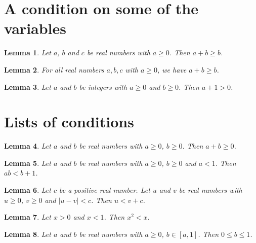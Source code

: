 \documentclass{article}
\newtheorem{lemma}{Lemma}
\begin{document}
\section{A condition on some of the variables}

\begin{lemma}\label{unused}
Let $a$, $b$ and $c$ be real numbers with $a\ge0$. Then $a+b\ge b$.
\end{lemma}

\begin{lemma}\label{forall}
For all real numbers $a,b,c$ with $a\ge0$, we have $a+b\ge b$.
\end{lemma}

\begin{lemma}\label{conjunction}
Let $a$ and $b$ be integers with $a\ge0$ and $b\ge0$. Then $a+1>0$.
\end{lemma}

\section{Lists of conditions}

\begin{lemma}\label{comma}
Let $a$ and $b$ be real numbers with $a\ge0$, $b\ge0$. Then $a+b\ge0$.
\end{lemma}

\begin{lemma}\label{list}
Let $a$ and $b$ be real numbers with $a\ge0$, $b\ge0$ and $a<1$. Then $ab<b+1$.
\end{lemma}

\begin{lemma}\label{earlier}
Let $c$ be a positive real number. Let $u$ and $v$ be real numbers with $u\ge0$, $v\ge0$ and $|u-v|<c$. Then $u<v+c$.
\end{lemma}

\begin{lemma}\label{again}
Let $x>0$ and $x<1$. Then $x^2<x$.
\end{lemma}

\begin{lemma}\label{interval}
Let $a$ and $b$ be real numbers with $a\ge0$, $b\in[a,1]$. Then $0\le b\le1$.
\end{lemma}
\end{document}
